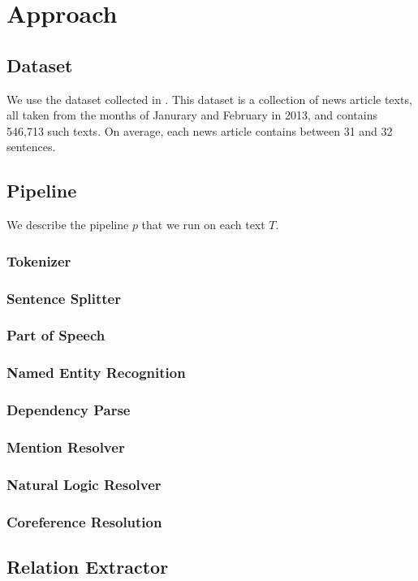 \section{Approach}

\subsection{Dataset}
We use the \newsspike{} dataset collected in \citet{zhang2013parallelparaphrase}.
This dataset is a collection of news article texts, all taken from the months of
Janurary and February in 2013, and contains 546,713 such texts. On average,
each news article contains between 31 and 32 sentences.

\subsection{Pipeline}
We describe the pipeline $p$ that we run on each text $T$. 
\citep{manning2014stanford}
\subsubsection{Tokenizer}
\subsubsection{Sentence Splitter}
\subsubsection{Part of Speech}
\citet{toutanova2003tagger}
\subsubsection{Named Entity Recognition}
\citet{finkel2005incorporating}
\subsubsection{Dependency Parse}
\citet{chen2014nndep}
\subsubsection{Mention Resolver}

\subsubsection{Natural Logic Resolver}
\subsubsection{Coreference Resolution}
\citet{clark2015coref}

\subsection{Relation Extractor}
\citet{angeli2015openie}

